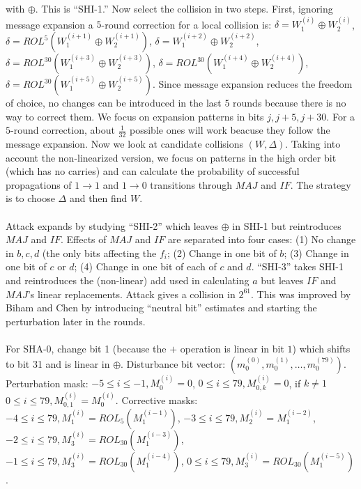 with $\oplus$.  This is ``SHI-1.''
Now select the collision in two steps.  
First, ignoring message expansion a $5$-round correction for a
local collision is: 
$\delta= W_1^{(i)} \oplus W_2^{(i)}$,
$\delta= ROL^{5}(W_1^{(i+1)} \oplus W_2^{(i+1)})$,
$\delta= W_1^{(i+2)} \oplus W_2^{(i+2)}$,
$\delta= ROL^{30}(W_1^{(i+3)} \oplus W_2^{(i+3)})$,
$\delta= ROL^{30}(W_1^{(i+4)} \oplus W_2^{(i+4)})$,
$\delta= ROL^{30}(W_1^{(i+5)} \oplus W_2^{(i+5)})$.
Since message expansion reduces the freedom of choice,
no changes can be introduced in the last $5$ rounds because there is
no way to correct them.  We focus on expansion patterns in bits $j, j+5, j+30$.
For a $5$-round correction, about ${\frac 1 {32}}$ possible ones will work beacuse they
follow the message
expansion.  Now we look at candidate collisions $(W, \Delta)$.  Taking into account
the non-linearized version, we focus on patterns in the high order bit (which has no carries) and
can calculate the probability of successful propagations of $1 \rightarrow 1$ and $1 \rightarrow 0$
transitions through $MAJ$ and $IF$.  The strategy is to choose $\Delta$ and then find $W$.
\\
\\
Attack expands by studying ``SHI-2'' which leaves $\oplus$ in SHI-1 but reintroduces
$MAJ$ and $IF$.  Effects of $MAJ$ and $IF$ are separated into four cases:
(1) No change in $b,c,d$ (the only bits affecting the $f_i$;
(2) Change in one bit of $b$;
(3) Change in one bit of $c$ or $d$;
(4) Change in one bit of each of $c$ and $d$.
``SHI-3'' takes SHI-1 and reintroduces the (non-linear) add used in calculating $a$ but leaves
$IF$ and $MAJ$'s linear replacements.  Attack gives a collision in $2^{61}$.  This was improved
by Biham and Chen by introducing ``neutral bit'' estimates and starting the perturbation later
in the rounds.
\\
\\
For SHA-0, change bit 1 (because the $+$ operation is linear in bit $1$)
which shifts to bit 31 and
is linear in $\oplus$.  Disturbance bit vector: 
$( m_{0}^{(0)}, m_{0}^{(1)}, \ldots , m_{0}^{(79)})$.  Perturbation mask:
$-5 \le i \le -1, M_{0}^{(i)}=0$,
$0 \le i \le 79, M_{0,k}^{(i)}=0$, if $k \ne 1$
$0 \le i \le 79, M_{0,1}^{(i)}= M_0^{(i)}$.  Corrective masks:
$-4 \le i \le 79, M_{1}^{(i)}= ROL_{5}(M_{1}^{(i-1)})$,
$-3 \le i \le 79, M_{2}^{(i)}= M_{1}^{(i-2)}$,
$-2 \le i \le 79, M_{3}^{(i)}= ROL_{30}(M_{1}^{(i-3)})$,
$-1 \le i \le 79, M_{3}^{(i)}= ROL_{30}(M_{1}^{(i-4)})$,
$0 \le i \le 79, M_{3}^{(i)}= ROL_{30}(M_{1}^{(i-5)})$.  
\\
